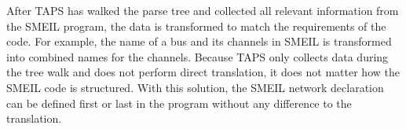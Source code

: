 After TAPS has walked the parse tree and collected all relevant information from the SMEIL program, the data is transformed to match the requirements of the \cspm{} code. For example, the name of a bus and its channels in SMEIL is transformed into combined names for the \cspm{} channels. Because TAPS only collects data during the tree walk and does not perform direct translation, it does not matter how the SMEIL code is structured. With this solution, the SMEIL network declaration can be defined first or last in the program without any difference to the translation.\\


%


